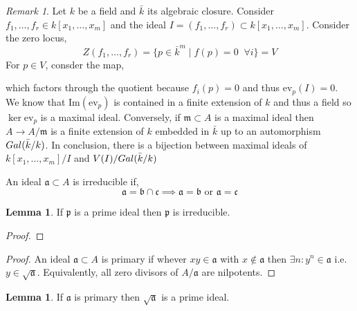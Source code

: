 \documentclass[12pt]{article}
\newcommand{\galgroup}[1]{Gal \small(#1 \small)}
\renewcommand{\Im}[1]{\mathrm{Im}(#1)}
\newcommand{\ev}{\mathrm{ev}}
\newcommand{\m}{\mathfrak{m}}
\theoremstyle{remark}
\newtheorem*{remark}{Remark}
\theoremstyle{definition}
\newtheorem{lemma}[theorem]{Lemma}
\newenvironment{definition}[1][Definition:]{\begin{trivlist}
\item[\hskip \labelsep {\bfseries #1}]}{\end{trivlist}}
\begin{document}
\begin{remark}
Let $k$ be a field and $\bar{k}$ its algebraic closure. Consider $f_1, \dots, f_r \in k[x_1, \dots, x_m]$ and the ideal $I = (f_1, \dots, f_r) \subset k[x_1, \dots, x_m]$. Consider the zero locus,
\[ Z(f_1, \dots, f_r) = \{ p \in \bar{k}^m \mid f(p) = 0 \;\; \forall i \} = V \]
For $p \in V$, consder the map,
\begin{center}
\end{center}
which factors through the quotient because $f_i(p) = 0$ and thus $\ev_p(I) = 0$. We know that $\Im{\ev_p}$ is contained in a finite extension of $k$ and thus a field so $\ker{\ev_p}$ is a maximal ideal. Conversely, if $\m \subset A$ is a maximal ideal then $A \to A / \m$ is a finite extension of $k$ embedded in $\bar{k}$ up to an automorphism $\galgroup{\bar{k}/k}$. In conclusion, there is a bijection between maximal ideals of $k[x_1, \dots, x_m] / I$ and $V(I) / \galgroup{\bar{k} / k}$
\end{remark}

\begin{definition}
An ideal $\mathfrak{a} \subset A$ is irreducible if,
\[ \mathfrak{a} = \mathfrak{b} \cap \mathfrak{c} \implies \mathfrak{a} = \mathfrak{b} \text{ or } \mathfrak{a} = \mathfrak{c} \]
\end{definition}

\begin{lemma}
If $\mathfrak{p}$ is a prime ideal then $\mathfrak{p}$ is irreducible. 
\end{lemma}

\begin{proof}

\end{proof}

\begin{proof}
An ideal $\mathfrak{a} \subset A$ is primary if whever $xy \in \mathfrak{a}$ with $x \notin \mathfrak{a}$ then $\exists n : y^n \in \mathfrak{a}$ i.e. $y \in \sqrt{\mathfrak{a}}$. Equivalently, all zero divisors of $A / \mathfrak{a}$ are nilpotents. 
\end{proof}
\renewcommand{\a}{\mathfrak{a}}
\renewcommand{\b}{\mathfrak{b}}


\begin{lemma}
If $\a$ is primary then $\sqrt{\a}$ is a prime ideal. 
\end{lemma}
\end{document}
